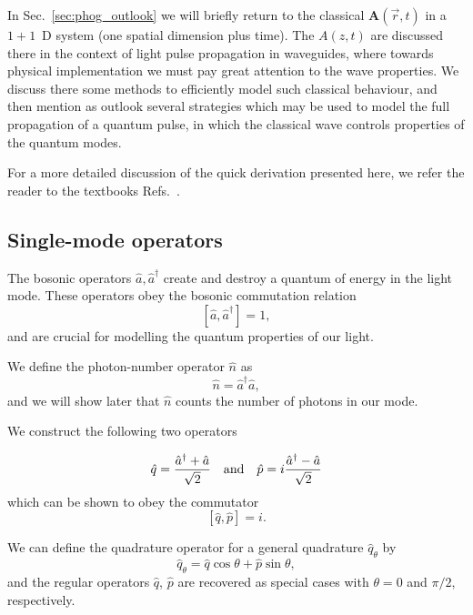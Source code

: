 In Sec.~\ref{sec:phog_outlook} we will briefly return to the classical $\bm{A}\left(\overrightarrow{r}, t\right)$ in a $1+1$~D system (one spatial dimension plus time). The $A\left(z, t\right)$ are discussed there in the context of light pulse propagation in waveguides, where towards physical implementation we must pay great attention to the wave properties. We discuss there some methods to efficiently model such classical behaviour, and then mention as outlook several strategies which may be used to model the full propagation of a quantum pulse, in which the classical wave controls properties of the quantum modes.

For a more detailed discussion of the quick derivation presented here, we refer the reader to the textbooks Refs.~\cite{Leonhardt2010, Walls_Millburn_Textbook, Gerry_Knight_Textbook}.


\FloatBarrier
\subsection{Single-mode operators}
The bosonic operators $\hat{a}, \hat{a}^\dagger$ create and destroy a quantum of energy in the light mode. These operators obey the bosonic commutation relation
\begin{equation}
\left[ \hat{a}, \hat{a}^\dagger \right] = 1,
\end{equation}
and are crucial for modelling the quantum properties of our light. 

We define the photon-number operator $\hat{n}$ as 
\begin{equation}
\hat{n} = \hat{a}^\dagger \hat{a},
\end{equation}
and we will show later that $\hat{n}$ counts the number of photons in our mode.

We construct the following two operators

\begin{equation}\label{eqn:intro_quadrature}
\hat{q} = \frac{\hat{a}^\dagger + \hat{a}}{\sqrt{2}} \qq{and} \hat{p} = i \frac{\hat{a}^\dagger - \hat{a}}{\sqrt{2}}
\end{equation}
which can be shown to obey the commutator
\begin{equation}\label{eqn:intro_quadrature_commutator}
\left[\hat{q}, \hat{p}\right] = i.
\end{equation}

\noindent We can define the quadrature operator for a general quadrature $\hat{q}_\theta$ by
\begin{equation}
\hat{q}_\theta = \hat{q} \cos\theta  + \hat{p} \sin\theta ,
\end{equation}
and the regular operators $\hat{q}$, $\hat{p}$ are recovered as special cases with $\theta = 0$ and $\pi/2$, respectively.


